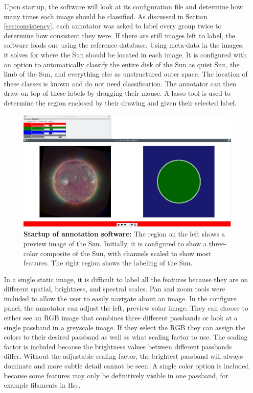 \documentclass[twoside]{report}
\newcommand{\halpha}{H$\alpha$\,}
\begin{document}
Upon startup, the software will look at its configuration file and determine how many times each image should be classified. As discussed in Section \ref{sec:consistency}, each annotator was asked to label every group twice to determine how consistent they were. If there are still images left to label, the software loads one using the reference database. Using meta-data in the images, it solves for where the Sun should be located in each image. It is configured with an option to automatically classify the entire disk of the Sun as quiet Sun, the limb of the Sun, and everything else as unstructured outer space. The location of these classes is known and do not need classification. The annotator can then draw on top of these labels by dragging their mouse. A lasso tool is used to determine the region enclosed by their drawing and given their selected label.

\begin{figure}[ht]
  \begin{center}
    \includegraphics[scale=0.25]{labeling-initial}
    \caption{{\bf Startup of annotation software:} The region on the left shows a preview image of the Sun. Initially, it is configured to show a three-color composite of the Sun, with channels scaled to show most features. The right region shows the labeling of the Sun.}
    \label{fig:label-initial}
 \end{center}
\end{figure}

In a single static image, it is difficult to label all the features because they are on different spatial, brightness, and spectral scales. Pan and zoom tools were included to allow the user to easily navigate about an image. In the configure panel, the annotator can adjust the left, preview solar image. They can choose to either see an RGB image that combines three different passbands or look at a single passband in a greyscale image. If they select the RGB they can assign the colors to their desired passband as well as what scaling factor to use. The scaling factor is included because the brightness values between different passbands differ. Without the adjustable scaling factor, the brightest passband will always dominate and more subtle detail cannot be seen. A single color option is included because some features may only be definitively visible in one passband, for example filaments in \halpha. 
\end{document}
